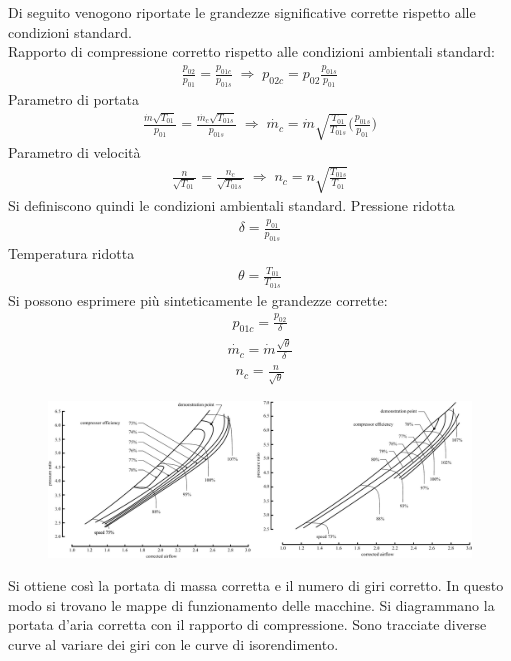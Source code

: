 Di seguito venogono riportate le grandezze significative corrette rispetto alle condizioni standard.\\
Rapporto di compressione corretto rispetto alle condizioni ambientali standard:
\begin{align*}
\frac{p_{02}}{p_{01}} = \frac{p_{01c}}{p_{01s}} \; \Rightarrow \; p_{02c} = p_{02}\frac{p_{01s}}{p_{01}}
\end{align*}
Parametro di portata
\begin{align*}
\frac{\dot{m}\sqrt{T_{01}}}{p_{01}}=\frac{\dot{m_c}\sqrt{T_{01s}}}{p_{01s}} \; \Rightarrow \; \dot{m_c} = \dot{m} \sqrt{\frac{T_{01}}{T_{01s}}} \bigg(\frac{p_{01s}}{p_{01}} \bigg)
\end{align*}
Parametro di velocità
\begin{align*}
\frac{n}{\sqrt{T_{01}}}=\frac{n_c}{\sqrt{T_{01s}}} \; \Rightarrow \; n_c = n \sqrt{\frac{T_{01s}}{T_{01}}}
\end{align*}
Si definiscono quindi le condizioni ambientali standard.
Pressione ridotta
\begin{align*}
\delta = \frac{p_{01}}{p_{01s}}
\end{align*}
Temperatura ridotta
\begin{align*}
\theta = \frac{T_{01}}{T_{01s}}
\end{align*}
Si possono esprimere più sinteticamente le grandezze corrette:
\begin{align*}
p_{01c} = \frac{p_{02}}{\delta}
\end{align*}
\begin{align*}
\dot{m_c}= \dot{m} \frac{\sqrt{\theta}}{\delta}
\end{align*}
\begin{align*}
n_c = \frac{n}{\sqrt{\theta}}
\end{align*}
\begin{figure}
\centering
  \includegraphics[width=\textwidth]{fig/CompMaps.pdf}
\caption{}
\label{}
\end{figure}
Si ottiene così la portata di massa corretta e il numero di giri corretto.
In questo modo si trovano le mappe di funzionamento delle macchine. Si diagrammano la portata d'aria corretta con il rapporto di compressione. Sono tracciate diverse curve al variare dei giri con le curve di isorendimento.

